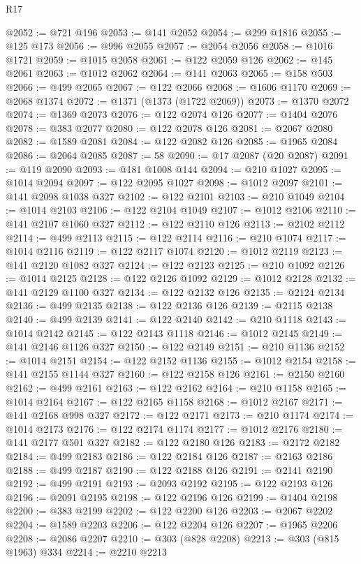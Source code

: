 \begin{lexlean}{R17}
\begin{coremodule}
{{{{{{{{{{{{{{{{{{{{{{{{{{{{{{{{{{{{{{{{{{{{{{{{{{{{{{{{{{{{{{{{{{{{{{{{{{{{{{{{{{{{{{{{{{{{{{{{{{{{{{{{{{{@2052 := @721 @196
@2053 := @141 @2052
@2054 := @299 @1816
@2055 := @125 @173
@2056 := @996 @2055
@2057 := @2054 @2056
@2058 := @1016 @1721
@2059 := @1015 @2058
@2061 := @122 @2059 @126
@2062 := @145 @2061
@2063 := @1012 @2062
@2064 := @141 @2063
@2065 := @158 @503
@2066 := @499 @2065
@2067 := @122 @2066
@2068 := @1606 @1170
@2069 := @2068 @1374
@2072 := @1371 (@1373 (@1722 @2069))
@2073 := @1370 @2072
@2074 := @1369 @2073
@2076 := @122 @2074 @126
@2077 := @1404 @2076
@2078 := @383 @2077
@2080 := @122 @2078 @126
@2081 := @2067 @2080
@2082 := @1589 @2081
@2084 := @122 @2082 @126
@2085 := @1965 @2084
@2086 := @2064 @2085
@2087 := 58
@2090 := @17 @2087 (@20 @2087)
@2091 := @119 @2090
@2093 := @181 @1008 @144
@2094 := @210 @1027
@2095 := @1014 @2094
@2097 := @122 @2095 @1027
@2098 := @1012 @2097
@2101 := @141 @2098 @1038 @327
@2102 := @122 @2101
@2103 := @210 @1049
@2104 := @1014 @2103
@2106 := @122 @2104 @1049
@2107 := @1012 @2106
@2110 := @141 @2107 @1060 @327
@2112 := @122 @2110 @126
@2113 := @2102 @2112
@2114 := @499 @2113
@2115 := @122 @2114
@2116 := @210 @1074
@2117 := @1014 @2116
@2119 := @122 @2117 @1074
@2120 := @1012 @2119
@2123 := @141 @2120 @1082 @327
@2124 := @122 @2123
@2125 := @210 @1092
@2126 := @1014 @2125
@2128 := @122 @2126 @1092
@2129 := @1012 @2128
@2132 := @141 @2129 @1100 @327
@2134 := @122 @2132 @126
@2135 := @2124 @2134
@2136 := @499 @2135
@2138 := @122 @2136 @126
@2139 := @2115 @2138
@2140 := @499 @2139
@2141 := @122 @2140
@2142 := @210 @1118
@2143 := @1014 @2142
@2145 := @122 @2143 @1118
@2146 := @1012 @2145
@2149 := @141 @2146 @1126 @327
@2150 := @122 @2149
@2151 := @210 @1136
@2152 := @1014 @2151
@2154 := @122 @2152 @1136
@2155 := @1012 @2154
@2158 := @141 @2155 @1144 @327
@2160 := @122 @2158 @126
@2161 := @2150 @2160
@2162 := @499 @2161
@2163 := @122 @2162
@2164 := @210 @1158
@2165 := @1014 @2164
@2167 := @122 @2165 @1158
@2168 := @1012 @2167
@2171 := @141 @2168 @998 @327
@2172 := @122 @2171
@2173 := @210 @1174
@2174 := @1014 @2173
@2176 := @122 @2174 @1174
@2177 := @1012 @2176
@2180 := @141 @2177 @501 @327
@2182 := @122 @2180 @126
@2183 := @2172 @2182
@2184 := @499 @2183
@2186 := @122 @2184 @126
@2187 := @2163 @2186
@2188 := @499 @2187
@2190 := @122 @2188 @126
@2191 := @2141 @2190
@2192 := @499 @2191
@2193 := @2093 @2192
@2195 := @122 @2193 @126
@2196 := @2091 @2195
@2198 := @122 @2196 @126
@2199 := @1404 @2198
@2200 := @383 @2199
@2202 := @122 @2200 @126
@2203 := @2067 @2202
@2204 := @1589 @2203
@2206 := @122 @2204 @126
@2207 := @1965 @2206
@2208 := @2086 @2207
@2210 := @303 (@828 @2208)
@2213 := @303 (@815 @1963) @334
@2214 := @2210 @2213
}}}}}}}}}}}}}}}}}}}}}}}}}}}}}}}}}}}}}}}}}}}}}}}}}}}}}}}}}}}}}}}}}}}}}}}}}}}}}}}}}}}}}}}}}}}}}}}}}}}}}}}}}}}
\end{coremodule}
\end{lexlean}
